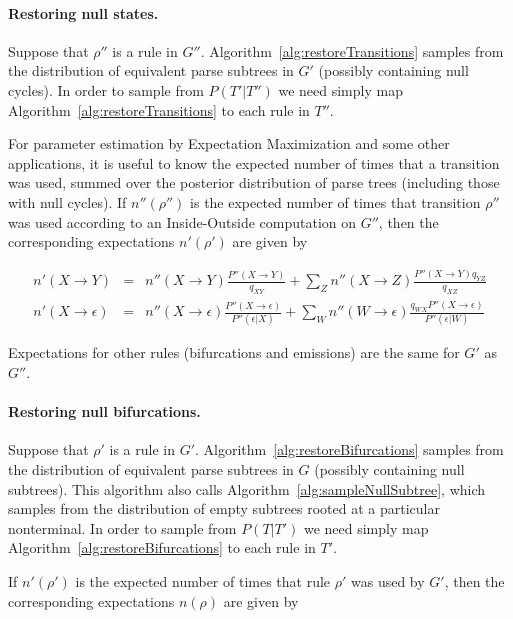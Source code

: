 \documentclass[10pt]{article}
\begin{document}
\paragraph{Restoring null states.}

Suppose that $\rho''$ is a rule in $G''$.
Algorithm~\ref{alg:restoreTransitions} samples from the distribution of equivalent parse subtrees in $G'$ (possibly containing null cycles).
In order to sample from $P(T'|T'')$ we need simply map Algorithm~\ref{alg:restoreTransitions} to each rule in $T''$.

For parameter estimation by Expectation Maximization and some other applications, it is useful to know the expected number
of times that a transition was used, summed over the posterior distribution of parse trees (including those with null cycles).
If $n''(\rho'')$ is the expected number of times that transition $\rho''$ was used according to an Inside-Outside computation on $G''$,
then the corresponding expectations $n'(\rho')$ are given by

\begin{eqnarray*}
       n'(X \to Y) & = & n''(X \to Y) \frac{P''(X \to Y)}{q_{XY}} + \sum_Z n''(X \to Z) \frac{P''(X \to Y) q_{YZ}}{q_{XZ}} \\
n'(X \to \epsilon) & = & n''(X \to \epsilon) \frac{P''(X \to \epsilon)}{P''(\epsilon | X)}
 + \sum_W n''(W \to \epsilon) \frac{q_{WX} P''(X \to \epsilon)}{P''(\epsilon | W)}
\end{eqnarray*}

Expectations for other rules (bifurcations and emissions) are the same for $G'$ as $G''$.


\paragraph{Restoring null bifurcations.}

Suppose that $\rho'$ is a rule in $G'$.
Algorithm~\ref{alg:restoreBifurcations} samples from the distribution of equivalent parse subtrees in $G$ (possibly containing null subtrees).
This algorithm also calls Algorithm~\ref{alg:sampleNullSubtree}, which samples from the distribution of empty subtrees rooted at a particular nonterminal.
In order to sample from $P(T|T')$ we need simply map Algorithm~\ref{alg:restoreBifurcations} to each rule in $T'$.

If $n'(\rho')$ is the expected number of times that rule $\rho'$ was used by $G'$,
then the corresponding expectations $n(\rho)$ are given by
\end{document}
